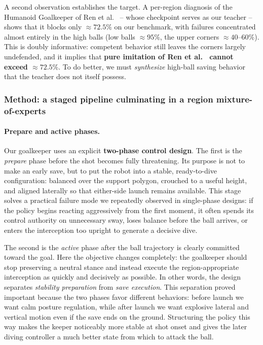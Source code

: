 \documentclass{article}
\begin{document}
A second observation establishes the target. A per-region diagnosis of the
Humanoid Goalkeeper of Ren et al.~\cite{ren} -- whose checkpoint serves as our
teacher -- shows that it blocks only $\approx 72.5\%$ on our benchmark, with
failures concentrated almost entirely in the high balls (low balls
$\approx 95\%$, the upper corners $\approx 40$--$60\%$). This is doubly
informative: competent behavior still leaves the corners largely undefended, and
it implies that \textbf{pure imitation of Ren et al.~\cite{ren} cannot exceed
$\approx 72.5\%$}. To do better, we must \emph{synthesize} high-ball saving
behavior that the teacher does not itself possess.

\subsubsection{Method: a staged pipeline culminating in a region mixture-of-experts}\label{sec:gk-method}

\paragraph{Prepare and active phases.} Our goalkeeper uses an explicit
\textbf{two-phase control design}. The first is the \emph{prepare} phase before
the shot becomes fully threatening. Its purpose is not to make an early save,
but to put the robot into a stable, ready-to-dive configuration: balanced over
the support polygon, crouched to a useful height, and aligned laterally so that
either-side launch remains available. This stage solves a practical failure
mode we repeatedly observed in single-phase designs: if the policy begins
reacting aggressively from the first moment, it often spends its control
authority on unnecessary sway, loses balance before the ball arrives, or enters
the interception too upright to generate a decisive dive.

The second is the \emph{active} phase after the ball trajectory is clearly
committed toward the goal. Here the objective changes completely: the
goalkeeper should stop preserving a neutral stance and instead execute the
region-appropriate interception as quickly and decisively as possible. In other
words, the design separates \emph{stability preparation} from \emph{save
execution}. This separation proved important because the two phases favor
different behaviors: before launch we want calm posture regulation, while after
launch we want explosive lateral and vertical motion even if the save ends on
the ground. Structuring the policy this way makes the keeper noticeably more
stable at shot onset and gives the later diving controller a much better state
from which to attack the ball.
\end{document}

